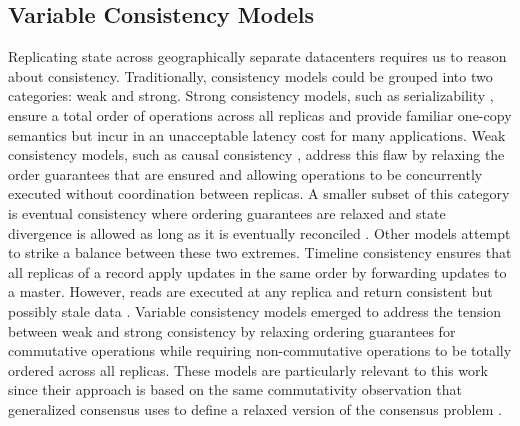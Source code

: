 \documentclass[runningheads,a4paper]{llncs}
\begin{document}
\subsection{Variable Consistency Models} \label{Variable Consistency}

Replicating state across geographically separate datacenters requires us to reason about consistency. Traditionally, consistency models could be grouped into two categories: weak and strong. Strong consistency models, such as serializability \cite{Herlihy1990}, ensure a total order of operations across all replicas and provide familiar one-copy semantics but incur in an unacceptable latency cost for many applications. Weak consistency models, such as causal consistency \cite{Ahamad1995}, address this flaw by relaxing the order guarantees that are ensured and allowing operations to be concurrently executed without coordination between replicas. A smaller subset of this category is eventual consistency where ordering guarantees are relaxed and state divergence is allowed as long as it is eventually reconciled \cite{Saito2005}. Other models attempt to strike a balance between these two extremes. Timeline consistency ensures that all replicas of a record apply updates in the same order by forwarding updates to a master. However, reads are executed at any replica and return consistent but possibly stale data \cite{Silberstein2008}. Variable consistency models emerged to address the tension between weak and strong consistency by relaxing ordering guarantees for commutative operations while requiring non-commutative operations to be totally ordered across all replicas. These models are particularly relevant to this work since their approach is based on the same commutativity observation that generalized consensus uses to define a relaxed version of the consensus problem \cite{Lamport2005}.\par
\end{document}
